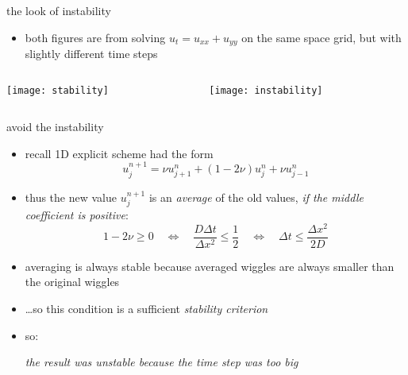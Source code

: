 \begin{frame}{the look of instability}

\begin{itemize}
\item both figures are from solving $u_t = u_{xx} + u_{yy}$ on the same space grid, but with slightly different time steps
\end{itemize}

\bigskip\bigskip
\begin{columns}
\begin{column}{0.5\textwidth}
\begin{center}
\texttt{[image: stability]}

\end{center}
\end{column}
\begin{column}{0.5\textwidth}
\begin{center}
\texttt{[image: instability]}

\end{center}
\end{column}
\end{columns}
\end{frame}


\begin{frame}{avoid the instability}
\label{slide:maxprinc}

\begin{itemize}
\item recall 1D explicit scheme had the form 
	$$u_j^{n+1} = \nu u_{j+1}^n + (1 - 2 \nu) u_j^n + \nu u_{j-1}^n$$
\item thus the new value $u_j^{n+1}$ is an \emph{average} of the old values, \emph{if the middle coefficient is positive}:
	$$1 - 2 \nu \ge 0 \quad \iff \quad  \frac{D\Delta t}{\Delta x^2} \le \frac{1}{2} \quad \iff \quad \Delta t \le \frac{\Delta x^2}{2 D}$$
\item averaging is always stable because averaged wiggles are always smaller than the original wiggles
\item \dots so this condition is a sufficient \emph{stability criterion}
\item so:

\begin{center}
\emph{the result was unstable because the time step was too big}
\end{center}
\end{itemize}
\end{frame}


